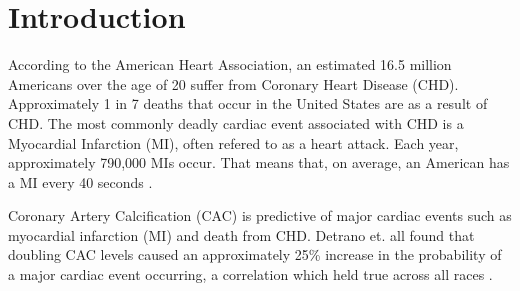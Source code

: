 \section{Introduction}

According to the American Heart Association, an estimated 16.5 million Americans over the age of 20 suffer from Coronary Heart Disease (CHD). Approximately 1 in 7 deaths that occur in the United States are as a result of CHD. The most commonly deadly cardiac event associated with CHD is a Myocardial Infarction (MI), often refered to as a heart attack. Each year, approximately 790,000 MIs occur. That means that, on average, an American has a MI every 40 seconds \cite{Benjamin2017}.

Coronary Artery Calcification (CAC) is predictive of major cardiac events such as myocardial infarction (MI) and death from CHD. Detrano et. all found that doubling CAC levels caused an approximately 25\% increase in the probability of a major cardiac event occurring, a correlation which held true across all races \cite{Detrano2008}. 




